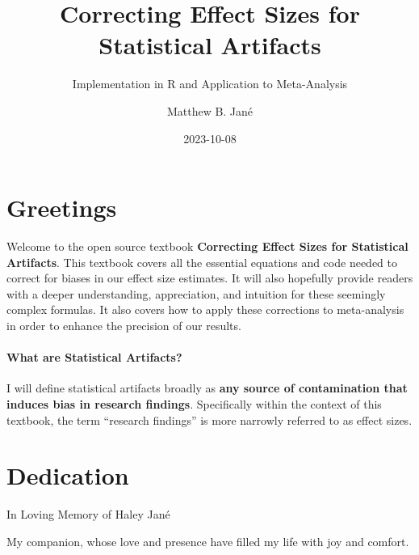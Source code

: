 \documentclass[
  letterpaper,
  DIV=11,
  numbers=noendperiod]{scrreprt}
\title{Correcting Effect Sizes for Statistical Artifacts}
\subtitle{Implementation in R and Application to Meta-Analysis}
\author{Matthew B. Jané}
\date{2023-10-08}
\renewcommand*\contentsname{Table of contents}
\newcommand\contentsname{Table of contents}
\begin{document}
\maketitle
\ifdefined\Shaded\renewenvironment{Shaded}{\begin{tcolorbox}[sharp corners, frame hidden, boxrule=0pt, borderline west={3pt}{0pt}{shadecolor}, interior hidden, enhanced, breakable]}{\end{tcolorbox}}\fi

\renewcommand*\contentsname{Table of contents}
{
\hypersetup{linkcolor=}
\setcounter{tocdepth}{2}
\tableofcontents
}

\hypertarget{greetings}{%
\chapter{Greetings}\label{greetings}}

Welcome to the open source textbook \textbf{Correcting Effect Sizes for
Statistical Artifacts}. This textbook covers all the essential equations
and code needed to correct for biases in our effect size estimates. It
will also hopefully provide readers with a deeper understanding,
appreciation, and intuition for these seemingly complex formulas. It
also covers how to apply these corrections to meta-analysis in order to
enhance the precision of our results.

\hypertarget{what-are-statistical-artifacts}{%
\subsubsection*{What are Statistical
Artifacts?}\label{what-are-statistical-artifacts}}

I will define statistical artifacts broadly as \textbf{any source of
contamination that induces bias in research findings}. Specifically
within the context of this textbook, the term ``research findings'' is
more narrowly referred to as effect sizes.


\hypertarget{dedication}{%
\chapter{Dedication}\label{dedication}}

In Loving Memory of Haley Jané

My companion, whose love and presence have filled my life with joy and
comfort.
\end{document}
